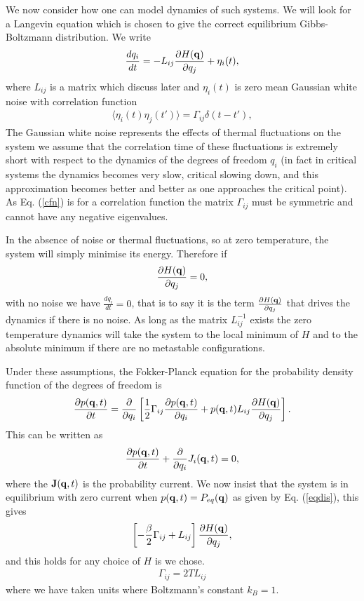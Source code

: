 We now consider how one can model dynamics of such systems. We will look for a Langevin equation which is chosen to give the correct equilibrium Gibbs-Boltzmann distribution. We write
\begin{align}
\frac{d q_i}{dt} = -L_{ij}\frac{\partial H({\bf q})}{ \partial q_j} + \eta_i(t),
\end{align}
where $L_{ij}$ is a matrix which discuss later and $\eta_i(t)$ is zero mean Gaussian white noise  with correlation function 
\begin{align}
\langle \eta_i(t)\eta_j(t')\rangle =  \Gamma_{ij} \delta(t-t'),\label{cfn}
\end{align}
The Gaussian white noise represents the effects of thermal fluctuations on the system we assume that the correlation time of these fluctuations is extremely short with respect to the dynamics of the degrees of freedom $q_i$ (in fact in critical systems the dynamics becomes very slow, critical slowing down, and this approximation becomes better and better as one approaches the critical point).  As Eq. (\ref{cfn}) is for a correlation function the matrix $\Gamma_{ij}$ must be symmetric and cannot have any negative eigenvalues.

In the absence of noise or thermal fluctuations, so at zero temperature, the system will simply minimise its energy. Therefore if 
\begin{align}
\frac{\partial H({\bf q})}{ \partial q_j} =0, 
\end{align}
with no noise we have $\frac{d q_i}{dt}=0$, that is to say it is the term $\frac{\partial H({\bf q})}{ \partial q_j}$ that drives the dynamics if there is no noise. As long as the matrix $L_{ij}^{-1}$ exists the zero temperature dynamics will take the system to the local minimum of $H$ and to the absolute minimum if there are no metastable configurations. 

Under these assumptions, the Fokker-Planck equation for the probability density function of the degrees of freedom is 
\begin{align}
\frac{\partial p({\bf q},t)}{\partial t} = \frac{\partial}{\partial q_i} \left[\frac{1}{2}\Gamma_{ij} \frac{\partial p({\bf q},t)}{\partial q_i} + p({\bf q},t) L_{ij}\frac{\partial H({\bf q})}{ \partial q_j}\right].
\end{align}
This can be written as 
\begin{align}
\frac{\partial p({\bf q},t)}{\partial t} +\frac{\partial}{\partial q_i}J_i({\bf q},t)=0,
\end{align}
where the ${\bf J}({\bf q},t)$ is the probability current. We now insist that the system is in equilibrium with zero current when $p({\bf q},t)= P_{eq}({\bf q})$ as given by Eq. (\ref{eqdis}), this gives
\begin{align}
\left[-\frac{\beta}{2}\Gamma_{ij} + L_{ij}\right]\frac{\partial H({\bf q})}{ \partial q_j},
\end{align}
and this holds for any choice of $H$ is we chose.
\begin{align}
\Gamma_{ij}= 2T L_{ij}
\end{align}
where we have taken units where Boltzmann's constant $k_B=1$. 
